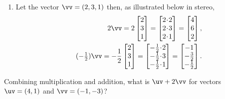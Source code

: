 \begin{example}
\begin{enumerate}
\item Let the vector \(\vv=(2,3,1)\) then, as illustrated below in stereo,
\begin{eqnarray*}&&
2\vv=2\begin{bmatrix} 2\\3\\1 \end{bmatrix}
=\begin{bmatrix} 2\cdot2\\2\cdot3\\2\cdot1 \end{bmatrix}
=\begin{bmatrix} 4\\6\\2 \end{bmatrix},
\\&& 
(-\tfrac12)\vv=-\frac12\begin{bmatrix} 2\\3\\1 \end{bmatrix}
=\begin{bmatrix} -\frac12\cdot2\\-\frac12\cdot3\\-\frac12\cdot1 \end{bmatrix}
=\begin{bmatrix} -1\\-\frac32\\-\frac12 \end{bmatrix}. 
\end{eqnarray*}
\begin{center}
\end{center}
\end{enumerate}
\end{example}



\begin{activity}
Combining multiplication and addition, what is \(\uv+2\vv\) for vectors \(\uv=(4,1)\) and \(\vv=(-1,-3)\)?
\end{activity}



